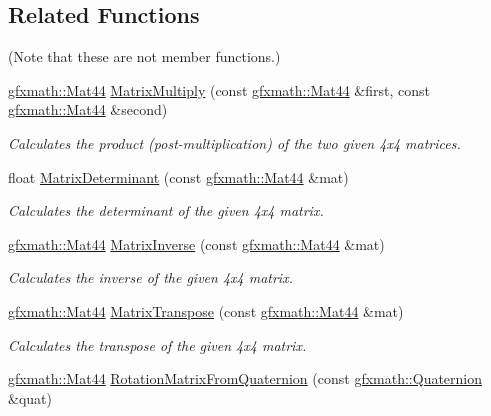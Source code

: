 \subsection*{Related Functions}
(Note that these are not member functions.) \begin{DoxyCompactItemize}
\item 
\hyperlink{structgfxmath_1_1_mat44}{gfxmath\+::\+Mat44} \hyperlink{structgfxmath_1_1_mat44_ad9b1aadd415480435190d1a31891d003}{Matrix\+Multiply} (const \hyperlink{structgfxmath_1_1_mat44}{gfxmath\+::\+Mat44} \&first, const \hyperlink{structgfxmath_1_1_mat44}{gfxmath\+::\+Mat44} \&second)
\begin{DoxyCompactList}\small\item\em Calculates the product (post-\/multiplication) of the two given 4x4 matrices. \end{DoxyCompactList}\item 
float \hyperlink{structgfxmath_1_1_mat44_a6af3b8d51ba895c9c01633af8cfe44a0}{Matrix\+Determinant} (const \hyperlink{structgfxmath_1_1_mat44}{gfxmath\+::\+Mat44} \&mat)
\begin{DoxyCompactList}\small\item\em Calculates the determinant of the given 4x4 matrix. \end{DoxyCompactList}\item 
\hyperlink{structgfxmath_1_1_mat44}{gfxmath\+::\+Mat44} \hyperlink{structgfxmath_1_1_mat44_aedb456e97994bc1f4e78b2fd63419b38}{Matrix\+Inverse} (const \hyperlink{structgfxmath_1_1_mat44}{gfxmath\+::\+Mat44} \&mat)
\begin{DoxyCompactList}\small\item\em Calculates the inverse of the given 4x4 matrix. \end{DoxyCompactList}\item 
\hyperlink{structgfxmath_1_1_mat44}{gfxmath\+::\+Mat44} \hyperlink{structgfxmath_1_1_mat44_a978f3fbeca724ed9464c491e2112775f}{Matrix\+Transpose} (const \hyperlink{structgfxmath_1_1_mat44}{gfxmath\+::\+Mat44} \&mat)
\begin{DoxyCompactList}\small\item\em Calculates the transpose of the given 4x4 matrix. \end{DoxyCompactList}\item 
\hyperlink{structgfxmath_1_1_mat44}{gfxmath\+::\+Mat44} \hyperlink{structgfxmath_1_1_mat44_ae3c487e5e2a5a974293d07e0adf9de40}{Rotation\+Matrix\+From\+Quaternion} (const \hyperlink{structgfxmath_1_1_quaternion}{gfxmath\+::\+Quaternion} \&quat)

\end{DoxyCompactItemize}
